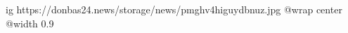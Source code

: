  
 
 
 
 

\ifcmt
  ig https://donbas24.news/storage/news/pmghv4higuydbnuz.jpg
  @wrap center
  @width 0.9
\fi
